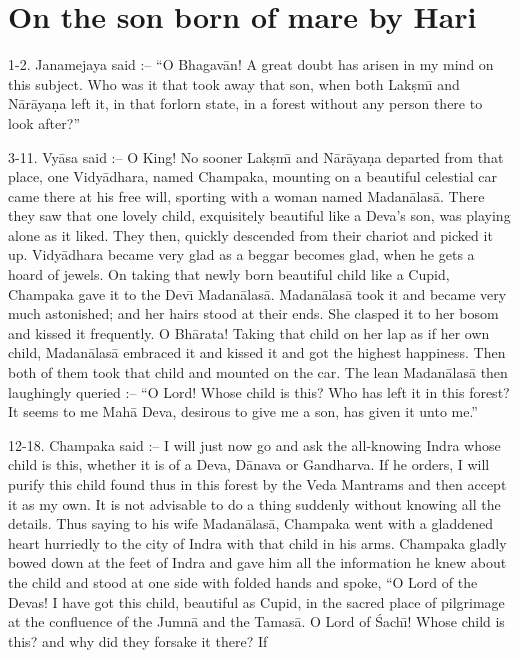 \chapter{On the son born of mare by Hari}

1-2. Janamejaya said :-- ``O Bhagav\=an! A great doubt has arisen in my mind on this subject. Who was it that took away that son, when both Lak\d{s}m\={\i} and N\=ar\=aya\d{n}a left it, in that forlorn state, in a forest without any person there to look after?''

3-11. Vy\=asa said :-- O King! No sooner Lak\d{s}m\={\i} and N\=ar\=aya\d{n}a departed from that place, one Vidy\=adhara, named Champaka, mounting on a beautiful celestial car came there at his free will, sporting with a woman named Madan\=alas\=a. There they saw that one lovely child, exquisitely beautiful like a Deva's son, was playing alone as it liked. They then, quickly descended from their chariot and picked it up. Vidy\=adhara became very glad as a beggar becomes glad, when he gets a hoard of jewels. On taking that newly born beautiful child like a Cupid, Champaka gave it to the Dev\={\i} Madan\=alas\=a. Madan\=alas\=a took it and became very much astonished; and her hairs stood at their ends. She clasped it to her bosom and kissed it frequently. O Bh\=arata! Taking that child on her lap as if her own child, Madan\=alas\=a embraced it and kissed it and got the highest happiness. Then both of them took that child and mounted on the car. The lean Madan\=alas\=a then laughingly queried :-- ``O Lord! Whose child is this? Who has left it in this forest? It seems to me Mah\=a Deva, desirous to give me a son, has given it unto me.''

12-18. Champaka said :-- I will just now go and ask the all-knowing Indra whose child is this, whether it is of a Deva, D\=anava or Gandharva. If he orders, I will purify this child found thus in this forest by the Veda Mantrams and then accept it as my own. It is not advisable to do a thing suddenly without knowing all the details. Thus saying to his wife Madan\=alas\=a, Champaka went with a gladdened heart hurriedly to the city of Indra with that child in his arms. Champaka gladly bowed down at the feet of Indra and gave him all the information he knew about the child and stood at one side with folded hands and spoke, ``O Lord of the Devas! I have got this child, beautiful as Cupid, in the sacred place of pilgrimage at the confluence of the Jumn\=a and the Tamas\=a. O Lord of \'Sach\={\i}! Whose child is this? and why did they forsake it there? If

